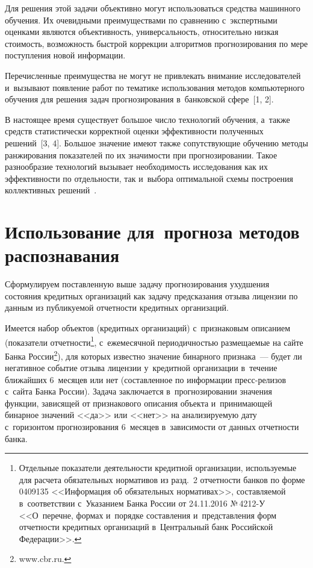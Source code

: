 \begin{multicols}{2}
 Для 
решения этой задачи объективно могут использо\-вать\-ся средства машинного 
обучения. Их очевидными преимуществами по сравнению с~экспертными 
оценками являются объ\-ек\-тив\-ность, универсаль\-ность, относительно низкая 
сто\-и\-мость, воз\-мож\-ность быст\-рой коррекции алгоритмов прогнозирования по 
мере поступления новой информации. 

Перечисленные преимущества не 
могут не привлекать внимание исследователей и~вызывают появление работ 
по тематике использования методов компьютерного обучения для решения 
задач прогнозирования в~банковской сфере~[1, 2]. 

      В настоящее время существует большое число технологий обучения, 
а~также средств статистически корректной оценки эффективности 
полученных решений~[3, 4]. Большое значение имеют также сопутствующие 
обучению методы ранжирования показателей по их значимости при 
прогнозировании. Такое разнообразие технологий вызывает необходимость 
исследования как их эф\-фек\-тив\-ности по отдельности, так и~выбора 
оптимальной схемы построения коллективных решений~\cite{3-sen}.
      
\section{Использование для~прогноза методов распознавания }

 Сформулируем поставленную выше задачу прогнозирования ухудшения 
состояния кредитных организа\-ций как задачу предсказания отзыва лицензии 
по данным из публикуемой отчетности кредитных организаций. 

Имеется 
набор объектов (кредитных организаций) с~признаковым описанием 
(показатели отчетности\footnote{Отдельные показатели деятельности 
кредитной организации, используемые для расчета обязательных нормативов 
из разд.~2 отчетности банков по форме 0409135 <<Информация об 
обязательных нормативах>>, составляемой в~соответствии с~Указанием 
Банка России от 24.11.2016 №\,4212-У <<О~перечне, формах и~порядке 
составления и~представления форм отчетности кредитных организаций 
в~Центральный банк Российской Федерации>>.}, с~ежемесячной 
периодичностью раз\-ме\-ща\-емые на сайте Банка России\footnote{\sf 
www.cbr.ru.}), для которых\linebreak
 известно значение бинарного признака~--- будет 
ли негативное событие отзыва лицензии у~кредитной организации в~течение 
ближайших 6~месяцев или нет (со\-став\-лен\-ное по информации  
пресс-ре\-ли\-зов с~сайта Банка России). Задача заключается 
в~прогнозировании значения функции, зависящей от признакового описания 
объекта и~принимающей бинарное значений <<да>> или <<нет>> на 
ана\-ли\-зи\-ру\-емую дату с~горизонтом прогнозирования 6~месяцев 
в~зависимости от данных отчетности банка. 


\end{multicols}
